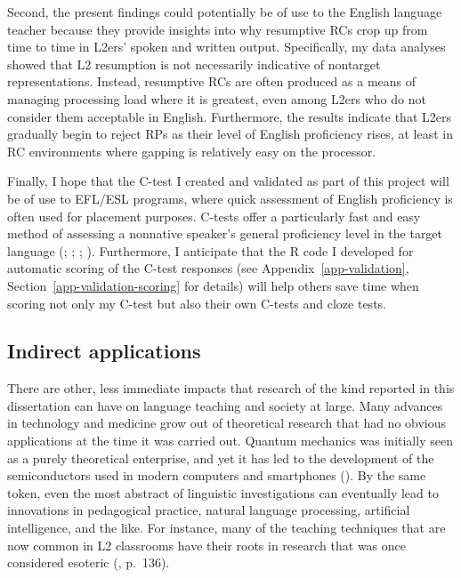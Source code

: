 Second, the present findings could potentially be of use to the English language teacher because they provide insights into why resumptive RCs crop up from time to time in L2ers' spoken and written output. Specifically, my data analyses showed that L2 resumption is not necessarily indicative of nontarget representations. Instead, resumptive RCs are often produced as a means of managing processing load where it is greatest, even among L2ers who do not consider them acceptable in English. Furthermore, the results indicate that L2ers gradually begin to reject RPs as their level of English proficiency rises, at least in RC environments where gapping is relatively easy on the processor.

Finally, I hope that the C-test I created and validated as part of this project will be of use to EFL/ESL programs, where quick assessment of English proficiency is often used for placement purposes. C-tests offer a particularly fast and easy method of assessing a nonnative speaker's general proficiency level in the target language (\cite{bachman1985}; \cite{dornyei.katona1992}; \cite{eckes.grotjahn2006}; \cite{park.choi2018}). Furthermore, I anticipate that the R code I developed for automatic scoring of the C-test responses (see Appendix~\ref{app-validation}, Section~\ref{app-validation-scoring} for details) will help others save time when scoring not only my C-test but also their own C-tests and cloze tests.

\subsection{Indirect applications}

There are other, less immediate impacts that research of the kind reported in this dissertation can have on language teaching and society at large. Many advances in technology and medicine grow out of theoretical research that had no obvious applications at the time it was carried out. Quantum mechanics was initially seen as a purely theoretical enterprise, and yet it has led to the development of the semiconductors used in modern computers and smartphones (\cite{lenz2016}). By the same token, even the most abstract of linguistic investigations can eventually lead to innovations in pedagogical practice, natural language processing, artificial intelligence, and the like. For instance, many of the teaching techniques that are now common in L2 classrooms have their roots in research that was once considered esoteric (\cite{sadeghi2022}, p.~136).

